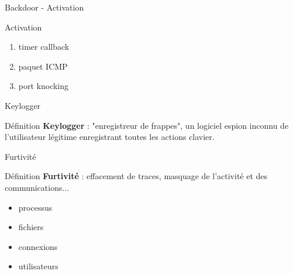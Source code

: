 \documentclass[10pt]{beamer}
\begin{document}
\begin{frame}{Backdoor - Activation}
	
    
    
	\begin{alertblock}{Activation}
		\begin{enumerate}
			\item timer callback
			\item paquet ICMP
			\item port knocking
		\end{enumerate}
    \end{alertblock}


\end{frame}

\begin{frame}{Keylogger}
	
	\begin{alertblock}{Définition}
		\textbf{Keylogger} : "enregistreur de frappes", un logiciel espion inconnu de l'utilisateur légitime enregistrant toutes les actions clavier.
    \end{alertblock}

\end{frame}

\begin{frame}{Furtivité}
	
	\begin{alertblock}{Définition}
		\textbf{Furtivité} : effacement de traces, masquage de l'activité et des communications...
    \end{alertblock}
	\begin{itemize}
		\item processus
		\item fichiers
		\item connexions
		\item utilisateurs
	\end{itemize}	 

\end{frame}
\end{document}
